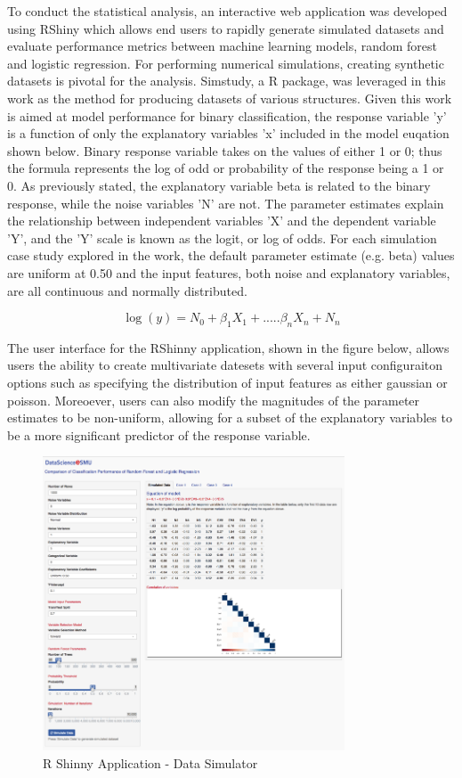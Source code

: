 \documentclass{llncs}
\begin{document}
To conduct the statistical analysis, an interactive web application was developed using RShiny which allows end users to rapidly generate simulated datasets and evaluate performance metrics between machine learning models, random forest and logistic regression. For performing numerical simulations, creating synthetic datasets is pivotal for the analysis. Simstudy, a R package, was leveraged in this work as the method for producing datasets of various structures. Given this work is aimed at model performance for binary classification, the response variable 'y' is a function of only the explanatory variables 'x' included in the model euqation shown below. Binary response variable takes on the values of either 1 or 0; thus the formula represents the log of odd or probability of the response being a 1 or 0. As previously stated, the explanatory variable beta is related to the binary response, while the noise variables 'N' are not. The parameter estimates explain the relationship between independent variables 'X' and the dependent variable 'Y', and the 'Y' scale is known as the logit, or log of odds. For each simulation case study explored in the work, the default parameter estimate (e.g. beta) values are uniform at 0.50 and the input features, both noise and explanatory variables, are all continuous and normally distributed. 


\begin{equation}
\log(y) = N_{0} + \beta_{1}X_{1} + .....\beta_{n}X_{n} + N_{n} 
\end{equation}

The user interface for the RShinny application, shown in the figure below, allows users the ability to create multivariate datesets with several input configuraiton options such as specifying the distribution of input features as either gaussian or poisson. Moreoever, users can also modify the magnitudes of the parameter estimates to be non-uniform, allowing for a subset of the explanatory variables to be a more significant predictor of the response variable. 

\begin{figure}
\centering
\includegraphics[width=0.8\textwidth]{rshiny.png}
\caption{R Shinny Application - Data Simulator}
\end{figure}
\end{document}
